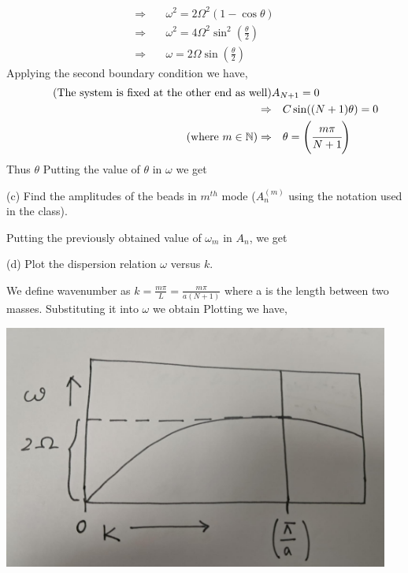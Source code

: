 \documentclass[addpoints]{exam}
\begin{document}
\begin{questions}
\begin{solution}
\begin{align*}
        \Rightarrow& \quad \omega^2 = 2\Omega^2(1-\cos\theta)\\ 
        \Rightarrow& \quad \omega^2 = 4\Omega^2\sin^2(\frac{\theta}{2})\\ 
        \Rightarrow& \quad \omega = 2\Omega \sin(\frac{\theta}{2})
    \end{align*}
    Applying the second boundary condition we have,
    \begin{align*}
        \tag{The system is fixed at the other end as well}
        &A_{N+1} = 0 \\
        \Rightarrow&\quad C\sin((N+1)\theta) = 0 \\ 
        \tag{where $m \in \mathbb{N}$}
        \Rightarrow& \quad \theta = \left(\cfrac{m\pi}{N+1}\right)\\ 
    \end{align*}
    Thus $\theta$
    Putting the value of $\theta$ in $\omega$ we get  
\end{solution}
(c) Find the amplitudes of the beads in $m^{th}$ mode ($A^{(m)}_n$ using the notation used in the class).
\begin{solution}
    Putting the previously obtained value of $\omega_m$ in $A_n$, we get  
    \begin{center}
    \end{center}
\end{solution}
(d) Plot the dispersion relation $\omega$ versus $k$.
\begin{solution}
    We define wavenumber as $k =\frac{m\pi}{L} = \frac{m\pi}{a(N+1)}$ where a is the length between two masses.
    Substituting it into $\omega$ we obtain 
    Plotting we have,
    \begin{center}
        \includegraphics[width = 5.0in]{q1d.jpeg}

\end{center}
\end{solution}
\end{questions}
\end{document}
